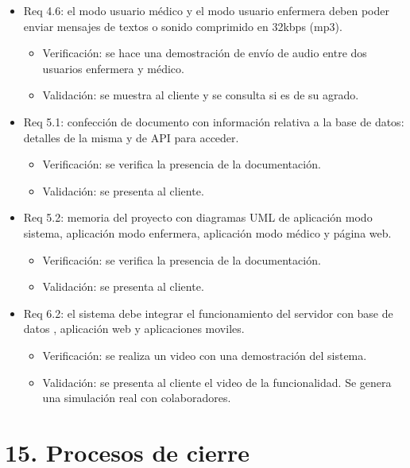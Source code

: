 \documentclass[
11pt, %
]{charter}
\begin{document}
\begin{itemize}
\item Req 4.6: el modo usuario médico y el modo usuario enfermera deben poder enviar mensajes de textos o sonido comprimido en 32kbps (mp3).
	\begin{itemize}
	\item Verificación: se hace una demostración de envío de audio entre dos usuarios enfermera y médico.
	\item Validación:  se muestra al cliente y se consulta si es de su agrado.
	\end{itemize}		

\item Req 5.1: confección de documento con información relativa a la base de datos: detalles de la misma y de API para acceder.
	\begin{itemize}
	\item Verificación: se verifica la presencia de la documentación.
	\item Validación:  se presenta al cliente.
	\end{itemize}	

\item Req 5.2: memoria del proyecto con diagramas UML de aplicación modo sistema, aplicación modo enfermera, aplicación modo médico y página web.

	\begin{itemize}
	\item Verificación: se verifica la presencia de la documentación.
	\item Validación:  se presenta al cliente.
	\end{itemize}		
		
\item Req 6.2: el sistema debe integrar el funcionamiento del servidor con base de datos , aplicación web y aplicaciones moviles.

	\begin{itemize}
	\item Verificación: se realiza un video con una demostración del sistema.
	\item Validación:  se presenta al cliente el video de la funcionalidad. Se genera una simulación real con colaboradores.
	\end{itemize}		

\end{itemize}

\section{15. Procesos de cierre}    
\label{sec:cierre}
\end{document}

